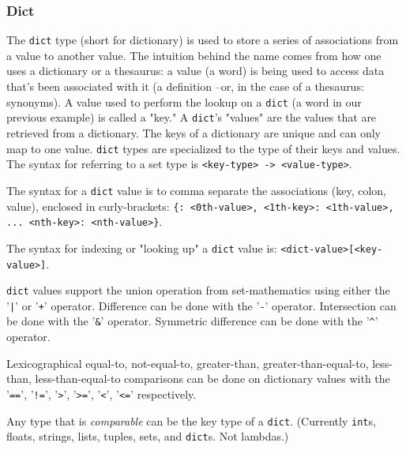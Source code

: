 
\subsubsection{Dict}
{
	The \texttt{dict} type (short for dictionary) is used to store
	a series of associations from a value to another value.
	The intuition behind the name comes from how one uses a dictionary or a
	thesaurus: a value (a word) is being used to access data that's been
	associated with it (a definition --or, in the case of a thesaurus: synonyms).
	A value used to perform the lookup on a \texttt{dict} (a word in our
	previous example) is called a "key." A \texttt{dict}'s "values" are the
	values that are retrieved from a dictionary.
	The keys of a dictionary are unique and can only map to one value.
	\texttt{dict} types are specialized to the type of their keys and values.
	The syntax for referring to a set type
	is \texttt{<key-type> -> <value-type>}.
	
	The syntax for a \texttt{dict} value is to comma
	separate the associations (key, colon, value), enclosed in
	curly-brackets: \texttt{\{<0th-key>: <0th-value>, <1th-key>: <1th-value>, ... <nth-key>: <nth-value>\}}.
	
	The syntax for indexing or "looking up" a \texttt{dict} value
	is: \texttt{<dict-value>[<key-value>]}.
	
	\texttt{dict} values support the union operation from set-mathematics using
	either the '\texttt{|}' or '\texttt{+}' operator. 
	Difference can be done with the '\texttt{-}' operator.
	Intersection can be done with the '\texttt{\&}' operator.
	Symmetric difference can be done with the '\texttt{\^}' operator.
	
	Lexicographical equal-to, not-equal-to, greater-than, greater-than-equal-to,
	less-than, less-than-equal-to comparisons can be done on dictionary values with
	the '\texttt{==}', '\texttt{!=}',
	'\texttt{>}', '\texttt{>=}', '\texttt{<}', '\texttt{<=}' respectively.
	
	Any type that is \textit{comparable} can be the key type of a \texttt{dict}.
	(Currently \texttt{int}s, floats, strings, lists, tuples,
		sets, and \texttt{dict}s. Not lambdas.)
}
